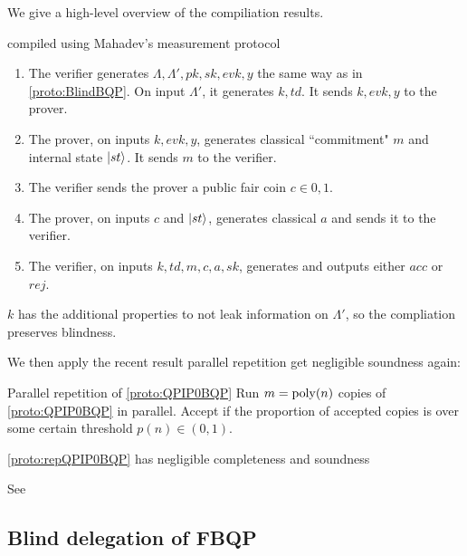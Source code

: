 We give a high-level overview of the compiliation results.

\begin{protocol}{ compiled using Mahadev's measurement protocol}
	\label{proto:QPIP0BQP}
	\begin{enumerate}
		\item The verifier generates $\Lambda, \Lambda', pk, sk, evk, y$ the same way as in \cref{proto:BlindBQP}.
			On input $\Lambda'$, it generates $k, td$.
			It sends $k, evk, y$ to the prover.
		\item The prover, on inputs $k, evk, y$, generates classical ``commitment" $m$ and internal state $\ket{st}$.
			It sends $m$ to the verifier.
		\item The verifier sends the prover a public fair coin $c\in{0,1}$.
		\item The prover, on inputs $c$ and $\ket{st}$, generates classical $a$ and sends it to the verifier.
		\item The verifier, on inputs $k, td, m, c, a, sk$, generates and outputs either $acc$ or $rej$.
	\end{enumerate}
\end{protocol}

$k$ has the additional properties to not leak information on $\Lambda'$, so the compliation preserves blindness. 

We then apply the recent result parallel repetition get negligible soundness again:

\begin{protocol}{Parallel repetition of \cref{proto:QPIP0BQP}}
	\label{proto:repQPIP0BQP}
	Run $m=\operatorname*{\operatorname{poly}}(n)$ copies of \cref{proto:QPIP0BQP} in parallel. Accept if the proportion of accepted copies is over some certain threshold $p(n)\in(0, 1)$.

\end{protocol}

\begin{thm}
	\cref{proto:repQPIP0BQP} has negligible completeness and soundness
\end{thm}
\begin{prf}
	See \cite{parallelrep} 
\end{prf}

\subsection{Blind delegation of FBQP}

